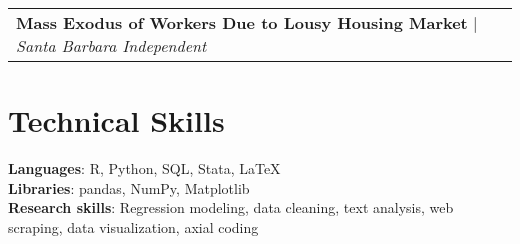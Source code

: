 \documentclass[letterpaper,11pt]{article}
\makeatletter
\newcommand{\resumeProjectHeading}[2]{
    \item
    \begin{tabular*}{0.97\textwidth}{l@{\extracolsep{\fill}}r}
      \small#1 & #2 \\
    \end{tabular*}\vspace{-7pt}
}
\newcommand{\resumeSubHeadingListEnd}{\end{itemize}}
\makeatother
\begin{document}
        \resumeProjectHeading
          {\textbf{Mass Exodus of Workers Due to Lousy Housing Market} $|$ \emph{Santa Barbara Independent}}
    
    \resumeSubHeadingListEnd



%
\section{Technical Skills}
 \begin{itemize}[leftmargin=0.15in, label={}]
    \small{\item{
     \textbf{Languages}{: R, Python, SQL, Stata, \LaTeX} \\
     \textbf{Libraries}{: pandas, NumPy, Matplotlib} \\
     \textbf{Research skills}{: Regression modeling, data cleaning, text analysis, web scraping, data visualization, axial coding}
    }}
 \end{itemize}


\end{document}
